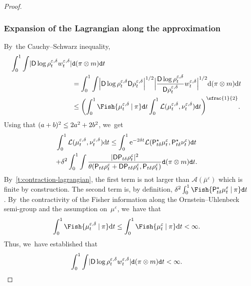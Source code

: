 \documentclass[JEP,XML,SOM,Unicode,published]{cedram}
\theoremstyle{definition}
\theoremstyle{remark}
\DeclarePairedDelimiter{\paren}{\lparen}{\rparen}
\DeclarePairedDelimiter{\abs}{\lvert}{\rvert}
\newcommand{\given}[1][]{%
\nonscript\:#1\vert
\allowbreak
\nonscript\:
\mathopen{}}
\begin{document}
\begin{proof}
\subsubsection*{Expansion of the Lagrangian along the approximation}
By~the Cauchy--Schwarz inequality,
\begin{equation*}
\begin{split}
\int_{0}^{1} \int \abs{\mathsf{D} \log \rho^{\varepsilon,\delta}_{t} w^{\varepsilon,\delta}_{t}}& \mathtt{d} (\pi \otimes m) \mathtt{d} t
\\&= \int_{0}^{1} \int \abs*{ \mathsf{D} \log \rho^{\varepsilon,\delta}_{t} \mathsf{D} \rho^{\varepsilon,\delta}_{t}}^{1/2} \abs[\Big]{\frac{\mathsf{D} \log \rho^{\varepsilon,\delta}_{t}}{\mathsf{D} \rho^{\varepsilon,\delta}_{t}} w^{\varepsilon,\delta}_{t}}^{1/2} \mathrm{d} (\pi \otimes m) \mathrm{d} t
\\& \leq \paren*{\int_{0}^{1} \Fish{ \mu^{\varepsilon,\delta}_{t} \given \pi} \mathtt{d} t \int_{0}^{1} \mathcal{L}(\mu^{\varepsilon,\delta}_{t}, \nu^{\varepsilon,\delta}_{t}) \mathtt{d} t}^{\sfrac{1}{2}}.
\end{split}
\end{equation*}
Using that $\paren{a+b}^{2} \le 2a^{2} + 2b^{2}$, we~get
\begin{multline*}
\int_{0}^{1} \mathcal{L}(\mu^{\varepsilon,\delta}_{t}, \nu^{\varepsilon,\delta}_{t}) \mathrm{d} t \leq \int_{0}^{1} \mathrm{e}^{-2\delta t} \mathcal{L}(\mathsf{P}^{\star}_{t \delta} \mu^{\varepsilon}_{t}, \mathsf{P}^{\star}_{t \delta} \nu^{\varepsilon}_{t}) \mathtt{d} t
\\+ \delta^{2} \int_{0}^{1} \int \frac{\abs{\mathsf{D} \mathsf{P}_{t \delta} \rho^{\varepsilon}_{t}}^{2}}{\theta(\mathsf{P}_{t \delta} \rho^{\varepsilon}_{t} + \mathsf{D} \mathsf{P}_{t \delta} \rho^{\varepsilon}_{t}, \mathsf{P}_{t \delta} \rho^{\varepsilon}_{t})} \mathtt{d} (\pi \otimes m) \mathtt{d} t.
\end{multline*}
By~\cref{t:contraction-lagrangian}, the first term is not larger than $\mathcal{A}(\bar{\mu}^{\varepsilon})$ which is finite by construction.
The second term is, by definition, $\delta^{2} \int_{0}^{1} \Fish{ \mathsf{P}^{\star}_{t\delta} \mu_{t}^{\varepsilon} \given \pi} \mathtt{d} t$.
By~the contractivity of the Fisher information along the Ornstein--Uhlenbeck semi-group and the assumption on~$\mu^{\varepsilon}$, we~have that
\begin{equation*}
\int_{0}^{1} \Fish{ \mu^{\varepsilon,\delta}_{t} \given \pi } \mathrm{d} t \leq \int_{0}^{1} \Fish{ \mu^{\varepsilon}_{t} \given \pi } \mathrm{d} t < \infty.
\end{equation*}
Thus, we~have established that
\begin{equation}\label{e:finiteness-w-d-log-rho}
\int_{0}^{1} \int \abs{\mathsf{D} \log \rho^{\varepsilon,\delta}_{t} w^{\varepsilon,\delta}_{t}} \mathtt{d} (\pi \otimes m) \mathtt{d} t < \infty.
\end{equation}


\end{proof}
\end{document}
